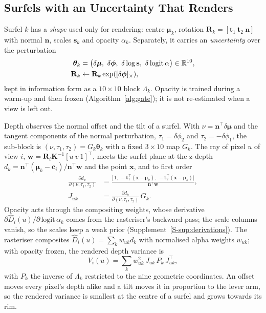 \subsection{Surfels with an Uncertainty That Renders}
\label{sec:method:surfels}
Surfel $k$ has a \emph{shape} used only for rendering: centre $\boldsymbol\mu_k$, rotation
$\mathbf{R}_k=[\mathbf{t}_1\ \mathbf{t}_2\ \mathbf{n}]$ with normal $\mathbf{n}$, scales $\mathbf{s}_k$ and
opacity $\alpha_k$. Separately, it carries an \emph{uncertainty} over the perturbation
\begin{equation}
\begin{split}
  \boldsymbol\theta_k&=\bigl(\delta\boldsymbol\mu,\ \delta\boldsymbol\phi,\ \delta\log\mathbf{s},\ \delta\,\mathrm{logit}\,\alpha\bigr)\in\R^{10},\\
  \mathbf{R}_k&\leftarrow\mathbf{R}_k\exp([\delta\boldsymbol\phi]_\times),
\end{split}
\end{equation}
kept in information form as a $10\times10$ block $\Lambda_k$. Opacity is trained during a warm-up and then
frozen (Algorithm~\ref{alg:gate}); it is not re-estimated when a view is left out.

Depth observes the normal offset and the tilt of a surfel. With $\nu=\mathbf{n}^{\top}\delta\boldsymbol\mu$
and the tangent components of the normal perturbation, $\tau_1=\delta\phi_2$ and $\tau_2=-\delta\phi_1$,
the sub-block is $(\nu,\tau_1,\tau_2)=G_k\boldsymbol\theta_k$ with a fixed $3\times10$ map $G_k$. The ray of
pixel $u$ of view $i$, $\mathbf{w}=\mathbf{R}_i\mathbf{K}^{-1}[u\ v\ 1]^{\top}$, meets the surfel plane at
the z-depth $d_k=\mathbf{n}^{\top}(\boldsymbol\mu_k-\mathbf{c}_i)/\mathbf{n}^{\top}\mathbf{w}$ and the point
$\mathbf{x}$, and to first order
\begin{equation}
\begin{split}
  \frac{\partial d_k}{\partial(\nu,\tau_1,\tau_2)}&=
  \frac{\bigl[\,1,\ -\mathbf{t}_1^{\top}(\mathbf{x}-\boldsymbol\mu_k),\ -\mathbf{t}_2^{\top}(\mathbf{x}-\boldsymbol\mu_k)\bigr]}{\mathbf{n}^{\top}\mathbf{w}},\\
  J_{uk}&=\frac{\partial d_k}{\partial(\nu,\tau_1,\tau_2)}\,G_k .
\end{split}
  \label{eq:jac}
\end{equation}
Opacity acts through the compositing weights, whose derivative
$\partial\hat D_i(u)/\partial\,\mathrm{logit}\,\alpha_k$ comes from the rasteriser's backward pass; the
scale columns vanish, so the scales keep a weak prior (Supplement~\ref{S-sup:derivations}). The rasteriser
composites $\hat D_i(u)=\sum_k w_{uk}d_k$ with normalised alpha weights $w_{uk}$; with opacity frozen, the
rendered depth variance is
\begin{equation}
  V_i(u)=\sum_k w_{uk}^{2}\,J_{uk}\,P_k\,J_{uk}^{\top},
  \label{eq:var}
\end{equation}
with $P_k$ the inverse of $\Lambda_k$ restricted to the nine geometric coordinates. An offset moves every
pixel's depth alike and a tilt moves it in proportion to the lever arm, so the rendered variance is
smallest at the centre of a surfel and grows towards its rim.

